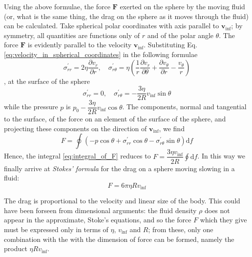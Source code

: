 \documentclass[conference]{IEEEtran}
\theoremstyle{definition}
\theoremstyle{remark}
\begin{document}
    Using the above formulae, the force $\mathbf{F}$ exerted on the sphere by the moving fluid (or, what is the same thing, the drag on the sphere as it moves through the fluid) can be calculated. Take spherical polar coordinates with axis parallel to $\mathbf{v}_\mathrm{inf}$; by symmetry, all quantities are functions only of $r$ and of the polar angle $\theta$. The force $\mathbf{F}$ is evidently parallel to the velocity $\mathbf{v}_\mathrm{inf}$. Substituting Eq. \ref{eq:velocity_in_spherical_coordinates} in the following formulae
    \begin{equation*}
        \sigma_{rr}^\prime = 2\eta \dfrac{\partial v_r}{\partial r}, \quad \sigma_{r\theta}^\prime = \eta \left( \dfrac1r \dfrac{\partial v_r}{\partial \theta} + \dfrac{\partial v_\theta}{\partial r} - \dfrac{v_\theta}{r} \right)
    \end{equation*}
    , at the surface of the sphere
    \begin{equation*}
        \sigma_{rr}^\prime = 0, \quad \sigma_{r\theta}^\prime = -\dfrac{3\eta}{2R} v_\mathrm{inf} \sin \theta
    \end{equation*}
    while the pressure $p$ is $p_0 - \dfrac{3\eta}{2R} v_\mathrm{inf} \cos \theta$. The components, normal and tangential to the surface, of the force on an element of the surface of the sphere, and projecting these components on the direction of $\mathbf{v}_\mathrm{inf}$, we find
    \begin{equation}
        F = \oint(-p \cos \theta + \sigma_{rr}^\prime \cos \theta - \sigma_{r\theta}^\prime \sin \theta) \mathrm{d} f
        \label{eq:integral_of_F}
    \end{equation}
    Hence, the integral \ref{eq:integral_of_F} reduces to $F = \dfrac{3\eta v_\mathrm{inf}}{2R} \oint \mathrm{d} f$. In this way we finally arrive at \emph{Stokes' formula} for the drag on a sphere moving slowing in a fluid:
    \begin{equation}
        F = 6\pi \eta R v_\mathrm{inf}
        \label{eq:Stokes_formula}
    \end{equation}
    
    The drag is proportional to the velocity and linear size of the body. This could have been forseen from dimensional arguments: the fluid density $\rho$ does not appear in the approximate, Stoke's equations, and so the force $F$ which they give must be expressed only in terms of $\eta$, $v_\mathrm{inf}$ and $R$; from these, only one combination with the with the dimension of force can be formed, namely the product $\eta R v_\mathrm{inf}$.
\end{document}
